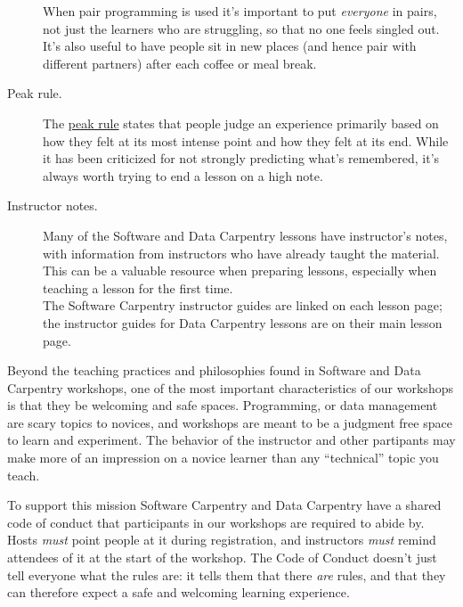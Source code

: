 \begin{description}
When pair programming is used it's important to put \emph{everyone} in
pairs, not just the learners who are struggling, so that no one feels
singled out. It's also useful to have people sit in new places (and
hence pair with different partners) after each coffee or meal break.
\item[Peak rule.]
The \href{https://en.wikipedia.org/wiki/Peak\%E2\%80\%93end\_rule}{peak
rule} states that people judge an experience primarily based on how they
felt at its most intense point and how they felt at its end. While it
has been criticized for not strongly predicting what's remembered, it's
always worth trying to end a lesson on a high note.
\item[Instructor notes.]
Many of the Software and Data Carpentry lessons have instructor's notes,
with information from instructors who have already taught the material.
This can be a valuable resource when preparing lessons, especially when
teaching a lesson for the first time.\\The Software Carpentry instructor
guides are linked on each lesson page; the instructor guides for Data
Carpentry lessons are on their
main lesson page.
\end{description}


Beyond the teaching practices and philosophies found in Software and
Data Carpentry workshops, one of the most important characteristics of
our workshops is that they be welcoming and safe spaces. Programming, or
data management are scary topics to novices, and workshops are meant to
be a judgment free space to learn and experiment. The behavior of the
instructor and other partipants may make more of an impression on a
novice learner than any ``technical'' topic you teach.

To support this mission Software Carpentry and Data Carpentry have a
shared code of conduct that
participants in our workshops are required to abide by. Hosts
\emph{must} point people at it during registration, and instructors
\emph{must} remind attendees of it at the start of the workshop. The
Code of Conduct doesn't just tell everyone what the rules are: it tells
them that there \emph{are} rules, and that they can therefore expect a
safe and welcoming learning experience.

